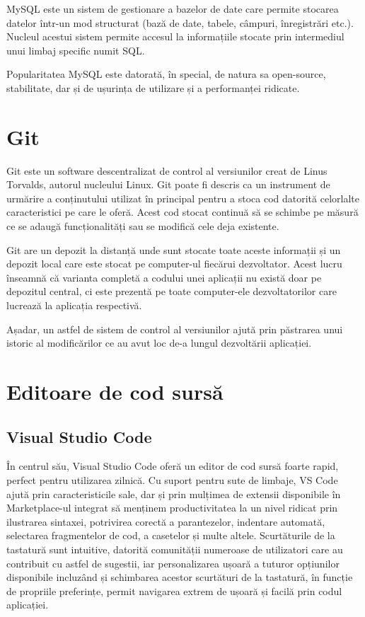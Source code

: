 MySQL este un sistem de gestionare a bazelor de date care permite stocarea datelor într-un mod structurat (bază de date, tabele, câmpuri, înregistrări etc.). Nucleul acestui sistem permite accesul la informațiile stocate prin intermediul unui limbaj specific numit SQL.\newline

Popularitatea MySQL este datorată, în special, de natura sa open-source, stabilitate, dar și de ușurința de utilizare și a performanței ridicate.\newline

\section{Git}

Git este un software descentralizat de control al versiunilor creat de Linus Torvalds, autorul nucleului Linux. Git poate fi descris ca un instrument de urmărire a conținutului utilizat în principal pentru a stoca cod datorită celorlalte caracteristici pe care le oferă. Acest cod stocat continuă să se schimbe pe măsură ce se adaugă funcționalități sau se modifică cele deja existente.\newline

Git are un depozit la distanță unde sunt stocate toate aceste informații și un depozit local care este stocat pe computer-ul fiecărui dezvoltator. Acest lucru înseamnă că varianta completă a codului unei aplicații nu există doar pe depozitul central, ci este prezentă pe toate computer-ele dezvoltatorilor care lucrează la aplicația respectivă.\newline

Așadar, un astfel de sistem de control al versiunilor ajută prin păstrarea unui istoric al modificărilor ce au avut loc de-a lungul dezvoltării aplicației.


\section{Editoare de cod sursă}
\subsection{Visual Studio Code}
În centrul său, Visual Studio Code oferă un editor de cod sursă foarte rapid, perfect pentru utilizarea zilnică. Cu suport pentru sute de limbaje, VS Code ajută prin caracteristicile sale, dar și prin mulțimea de extensii disponibile în Marketplace-ul integrat să menținem productivitatea la un nivel ridicat prin ilustrarea sintaxei, potrivirea corectă a parantezelor, indentare automată, selectarea fragmentelor de cod, a casetelor și multe altele. Scurtăturile de la tastatură sunt intuitive, datorită comunității numeroase de utilizatori care au contribuit cu astfel de sugestii, iar personalizarea ușoară a tuturor opțiunilor disponibile incluzând și schimbarea acestor scurtături de la tastatură, în funcție de propriile preferințe, permit navigarea extrem de ușoară și facilă prin codul aplicației.\newline

